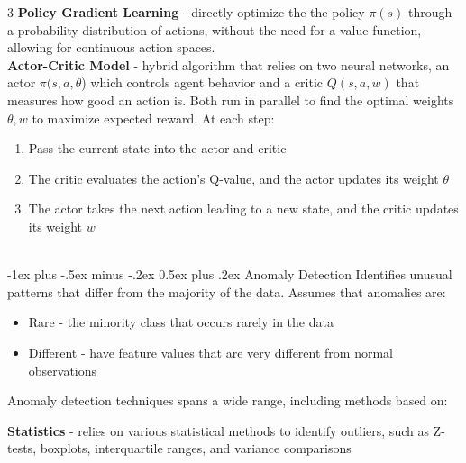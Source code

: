 \documentclass[10pt,landscape]{article}
\makeatletter
\renewcommand{\section}{\@startsection{section}{1}{0mm}%
                                {-1ex plus -.5ex minus -.2ex}%
                                {0.5ex plus .2ex}%
                                {\normalfont\large\bfseries}}
\makeatother
\begin{document}
\begin{multicols}{3}
    \textbf{Policy Gradient Learning} - directly optimize the the policy $\pi(s)$ through a probability distribution of actions, without the need for a value function, allowing for continuous action spaces.  \\
    \smallskip
    \textbf{Actor-Critic Model} - hybrid algorithm that relies on two neural networks, an actor $\pi(s,a,\theta$) which controls agent behavior  and a critic $Q(s,a,w)$ that measures how good an action is. Both run in parallel to find the optimal weights $\theta, w$ to maximize expected reward. At each step:
        \begin{enumerate}[leftmargin=5mm]
            \itemsep -.4mm
            \item Pass the current state into the actor and critic
            \item The critic evaluates the action's Q-value, and the actor updates its weight $\theta$
            \item The actor takes the next action leading to a new state, and the critic updates its weight $w$
        \end{enumerate}

        \textcolor{white}{.}\vspace{-4mm}\\ %
        \section{Anomaly Detection}
        Identifies unusual patterns that differ from the majority of the data. Assumes that anomalies are:
        \begin{itemize}[label={--},leftmargin=4mm]
            \itemsep -.4mm
            \item Rare - the minority class that occurs rarely in the data
            \item Different - have feature values that are very different from normal observations
        \end{itemize}
        Anomaly detection techniques spans a wide range, including methods based on:

        \textbf{Statistics} - relies on various statistical methods to identify outliers, such as Z-tests, boxplots, interquartile ranges, and variance comparisons


\end{multicols}
\end{document}

